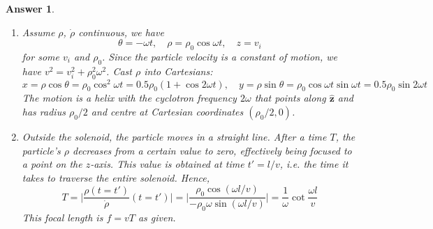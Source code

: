 \documentclass[a4paper]{article}
\newtheorem{ans}{Answer}[section]
\theoremstyle{new}
\begin{document}
\begin{ans}
\begin{enumerate}[label=(\alph*)]
where the $B$ term is zero outside. Now, $\dot{\theta}=-\frac{qB}{2\gamma m}$ inside. Let this be $\dot{\theta}:=-\omega$, then we have
$$\gamma m\ddot{\rho}=m\gamma\rho\omega^2+q\rho B\bigg(-\frac{qB}{2\gamma m}\bigg)=-\frac{q^2B^2\rho}{4m\gamma}$$
We thus have the simple harmonic motion equation for $\rho$, i.e. $\ddot{\rho}=-\rho\omega^2$.
\item Assume $\rho$, $\dot{\rho}$ continuous, we have
$$\theta=-\omega t,\quad\rho=\rho_0\cos\omega t,\quad z=v_i$$
for some $v_i$ and $\rho_0$. Since the particle velocity is a constant of motion, we have $v^2=v_i^2+\rho_0^2\omega^2$. Cast $\rho$ into Cartesians:
$$x=\rho\cos\theta=\rho_0\cos^2\omega t=0.5\rho_0(1+\cos2\omega t),\quad y=\rho\sin\theta=\rho_0\cos\omega t\sin\omega t=0.5\rho_0\sin2\omega t$$
The motion is a helix with the cyclotron frequency $2\omega$ that points along $\mathbf{\hat{z}}$ and has radius $\rho_0/2$ and centre at Cartesian coordinates $(\rho_0/2,0)$.
\item Outside the solenoid, the particle moves in a straight line. After a time $T$, the particle's $\rho$ decreases from a certain value to zero, effectively being focused to a point on the $z$-axis. This value is obtained at time $t'=l/v$, i.e. the time it takes to traverse the entire solenoid. Hence,
$$T=\bigg|\frac{\rho(t=t')}{\dot{\rho}}(t=t')\bigg|=\bigg|\frac{\rho_0\cos(\omega l/v)}{-\rho_0\omega\sin(\omega l/v)}\bigg|=\frac{1}{\omega}\cot\frac{\omega l}{v}$$
This focal length is $f=vT$ as given.
\end{enumerate}
\end{ans}
\newpage
\end{document}
